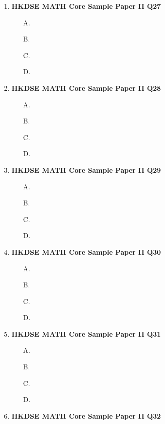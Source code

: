 \documentclass[12pt]{article}
\begin{document}
\begin{enumerate}
\begin{enumerate}
		\item[B.]
		\item[C.]
		\item[D.]
	\end{enumerate}
	\item \textbf{HKDSE MATH Core Sample Paper II Q27}\\
	\begin{enumerate}
		\item[A.]
		\item[B.]
		\item[C.]
		\item[D.]
	\end{enumerate}
	\item \textbf{HKDSE MATH Core Sample Paper II Q28}\\
	\begin{enumerate}
		\item[A.]
		\item[B.]
		\item[C.]
		\item[D.]
	\end{enumerate}
	\item \textbf{HKDSE MATH Core Sample Paper II Q29}\\
	\begin{enumerate}
		\item[A.]
		\item[B.]
		\item[C.]
		\item[D.]
	\end{enumerate}
	\item \textbf{HKDSE MATH Core Sample Paper II Q30}\\
	\begin{enumerate}
		\item[A.]
		\item[B.]
		\item[C.]
		\item[D.]
	\end{enumerate}
	\item \textbf{HKDSE MATH Core Sample Paper II Q31}\\
	\begin{enumerate}
		\item[A.]
		\item[B.]
		\item[C.]
		\item[D.]
	\end{enumerate}
	\item \textbf{HKDSE MATH Core Sample Paper II Q32}\\

\end{enumerate}
\end{document}
